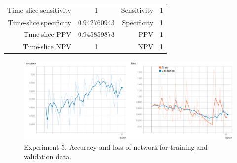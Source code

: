 \documentclass[preprint,12pt]{elsarticle}
\begin{document}
\begin{table}
{\begin{tabular}{ | c | c | c | c | c | c | c | c | }
		\multicolumn{2}{|r|}{Time-slice sensitivity} & 
		\multicolumn{2}{c|}{ 1 } &
		\multicolumn{2}{|r|}{Sensitivity} & 
		\multicolumn{2}{c|}{ 1 } \\ 
		
		\multicolumn{2}{|r|}{Time-slice specificity} & 
		\multicolumn{2}{c|}{ 0.942760943 } &
		\multicolumn{2}{|r|}{Specificity} & 
		\multicolumn{2}{c|}{ 1 } \\ 
		
		\multicolumn{2}{|r|}{Time-slice PPV} & 
		\multicolumn{2}{c|}{ 0.945859873 } &
		\multicolumn{2}{|r|}{PPV} & 
		\multicolumn{2}{c|}{ 1 } \\ 
		
		\multicolumn{2}{|r|}{Time-slice NPV} & 
		\multicolumn{2}{c|}{ 1 } &
		\multicolumn{2}{|r|}{NPV} & 
		\multicolumn{2}{c|}{ 1 } \\ \hline
	\end{tabular}
}
\label{table:tests_5}
\end{table}
\begin{figure}
\includegraphics[width=\linewidth]{images/tests_5}
\caption{Experiment 5. Accuracy and loss of network for training and validation data.}
\label{fig:tests_5}
\end{figure}
\end{document}
